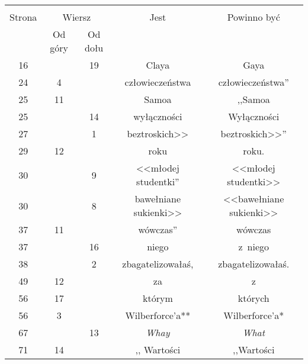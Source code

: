 \documentclass[a4paper,11pt]{article}
\begin{document}




\vspace{\spaceTwo} \vspace{\spaceThree}





\begin{center}
  \begin{tabular}{|c|c|c|c|c|}
    \hline
    & \multicolumn{2}{c|}{} & & \\
    Strona & \multicolumn{2}{c|}{Wiersz} & Jest
                              & Powinno być \\ \cline{2-3}
    & Od góry & Od dołu & & \\
    \hline
    16  & & 19 & Claya & Gaya \\
    24  &  4 & & człowieczeństwa & człowieczeństwa'' \\
    25  & 11 & & Samoa & ,,Samoa  %
    \\
    25  & & 14 & wyłączności & Wyłączności \\
    27  & &  1 & beztroskich>> & beztroskich>>'' \\
    29  & 12 & & roku & roku. \\
    30  & &  9 & <<młodej studentki''  %
           & <<młodej studentki>> \\
    30  & &  8 & bawełniane sukienki>> & <<bawełniane sukienki>> \\
    37  & 11 & & wówczas'' & wówczas \\
    37  & & 16 & niego & z~niego \\
    38  & &  2 & zbagatelizowałaś, & zbagatelizowałaś. \\
    49  & 12 & & za & z \\
    56  & 17 & & którym & których \\
    56  &  3 & & Wilberforce'a** & Wilberforce'a* \\
    67  & & 13 & \emph{Whay} & \emph{What} \\
    71  & 14 & & ,, Wartości  %
           & ,,Wartości  %
    \\

\end{tabular}
\end{center}
\end{document}
